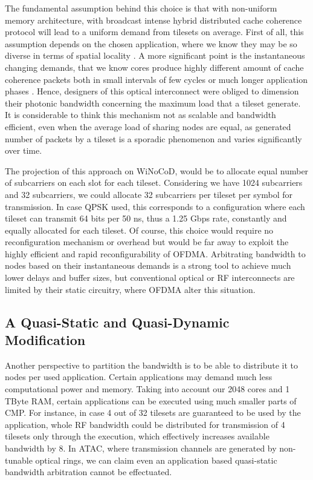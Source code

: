 The fundamental assumption behind this choice is that with non-uniform memory architecture, with broadcast intense hybrid distributed cache coherence protocol will lead to a uniform demand from tilesets on average. First of all, this assumption depends on the chosen application, where we know they may be so diverse in terms of spatial locality \cite{soteriou2006statistical}. A more significant point is the instantaneous changing demands, that we know cores produce highly different amount of cache coherence packets both in small intervals of few cycles or much longer application phases \cite{nychis2012chip}. Hence, designers of this optical interconnect were obliged to dimension their photonic bandwidth concerning the maximum load that a tileset generate. It is considerable to think this mechanism not as scalable and bandwidth efficient, even when the average load of sharing nodes are equal, as generated number of packets by a tileset is a sporadic phenomenon and varies significantly over time. 

The projection of this approach on WiNoCoD, would be to allocate equal number of subcarriers on each slot for each tileset. Considering we have 1024 subcarriers and 32 subcarriers, we could allocate 32 subcarriers per tileset per symbol for transmission. In case QPSK used, this corresponds to a configuration where each tileset can transmit 64 bits per 50 ns, thus a 1.25 Gbps rate, constantly and equally allocated for each tileset. Of course, this choice would require no reconfiguration mechanism or overhead but would be far away to exploit the highly efficient and rapid reconfigurability of OFDMA. Arbitrating bandwidth to nodes based on their instantaneous demands is a strong tool to achieve much lower delays and buffer sizes, but conventional optical or RF interconnects are limited by their static circuitry, where OFDMA alter this situation.

\subsection{A Quasi-Static and Quasi-Dynamic Modification}

Another perspective to partition the bandwidth is to be able to distribute it to nodes per used application. Certain applications may demand much less computational power and memory. Taking into account our 2048 cores and 1 TByte RAM, certain applications can be executed using much smaller parts of CMP. For instance, in case 4 out of 32 tilesets are guaranteed to be used by the application, whole RF bandwidth could be distributed for transmission of 4 tilesets only through the execution, which effectively increases available bandwidth by 8. In ATAC, where transmission channels are generated by non-tunable optical rings, we can claim even an application based quasi-static bandwidth arbitration cannot be effectuated. 

